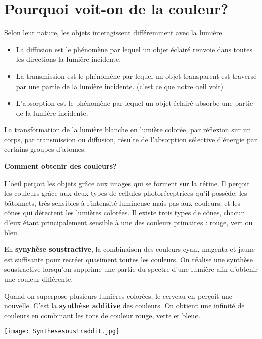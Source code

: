 \documentclass{article}
\begin{document}
\section{Pourquoi voit-on de la couleur?}

Selon leur nature, les objets interagissent différemment avec la lumière.
\begin{itemize}
    \item La diffusion est le phénomène par lequel un objet éclairé renvoie dans toutes les directions la lumière incidente.
    \item La transmission est le phénomène par lequel un objet transparent est traversé par une partie de la lumière incidente. (c'est ce que notre oeil voit)
    \item L'absorption est le phénomène par lequel un objet éclairé absorbe une partie de la lumière incidente.
\end{itemize}

La transformation de la lumière blanche en lumière colorée, par réflexion sur un corps, par transmission ou diffusion, résulte de l'absorption sélective d'énergie par certains groupes d'atomes.\medskip

\textbf{Comment obtenir des couleurs?} \medskip

L'oeil perçoit les objets grâce aux images qui se forment sur la rétine. Il perçoit les couleurs grâce aux deux types de cellules photoréceptrices qu'il possède: les bâtonnets, très sensibles à l'intensité lumineuse mais pas aux couleurs, et les cônes qui détectent les lumières colorées.
Il existe trois types de cônes, chacun d'eux étant principalement sensible à une des couleurs primaires : rouge, vert ou bleu.\medskip

En \textbf{synyhèse soustractive}, la combinaison des couleurs cyan, magenta et jaune est suffisante pour recréer quasiment toutes les couleurs. On réalise une synthèse soustractive lorsqu'on supprime une partie du spectre d'une lumière afin d'obtenir une couleur différente. \medskip

Quand on superpose plusieurs lumières colorées, le cerveau en perçoit une nouvelle. C'est la \textbf{synthèse additive} des couleurs. On obtient une infinité de couleurs en combinant les tons de couleur rouge, verte et bleue.

\begin{center}
    \texttt{[image: Synthesesoustraddit.jpg]}
\end{center}
\end{document}
